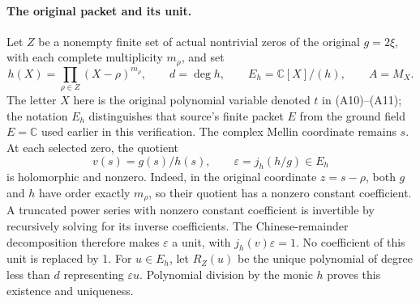 \paragraph{The original packet and its unit.}
Let \(Z\) be a nonempty finite set of actual nontrivial zeros of the
original \(g=2\xi\), with each complete multiplicity \(m_\rho\), and set
\[
 h(X)=\prod_{\rho\in Z}(X-\rho)^{m_\rho},\qquad
 d=\deg h,\qquad E_h=\mathbb C[X]/(h),\qquad A=M_X.
\]
The letter \(X\) here is the original polynomial variable denoted \(t\)
in (A10)--(A11); the notation \(E_h\) distinguishes that source's finite
packet \(E\) from the ground field \(E=\mathbb C\) used earlier in this
verification. The complex Mellin coordinate remains \(s\). At each selected
zero, the quotient
\[
 v(s)=g(s)/h(s),\qquad \varepsilon=j_h(h/g)\in E_h
\]
is holomorphic and nonzero. Indeed, in the original coordinate
\(z=s-\rho\), both \(g\) and \(h\) have order exactly \(m_\rho\), so their
quotient has a nonzero constant coefficient. A truncated power series with
nonzero constant coefficient is invertible by recursively solving for
its inverse coefficients. The Chinese-remainder decomposition therefore
makes \(\varepsilon\) a unit, with
\(j_h(v)\varepsilon=1\). No coefficient of this unit is replaced by 1.
For \(u\in E_h\), let \(R_Z(u)\) be the unique polynomial of degree less
than \(d\) representing \(\varepsilon u\). Polynomial division by the
monic \(h\) proves this existence and uniqueness.

